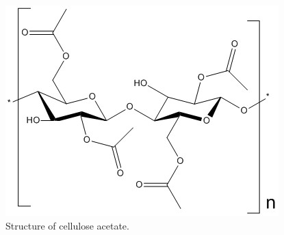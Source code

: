 \begin{figure}[ht!]
    \centering
    \includegraphics[width=0.7\columnwidth, keepaspectratio]{4-cbs/figs/cellulose_acetate.jpg}
    \caption{Structure of cellulose acetate.}
    \label{fig:cellulose_acetate}
\end{figure}


